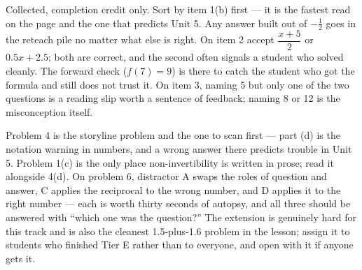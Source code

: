 \documentclass[10pt]{article}
\begin{document}
\begin{teachernote}
Collected, completion credit only. Sort by item 1(b) first --- it is the fastest
read on the page and the one that predicts Unit 5. Any answer built out of
$-\tfrac{1}{2}$ goes in the reteach pile no matter what else is right. On item 2
accept $\dfrac{x+5}{2}$ or $0.5x + 2.5$; both are correct, and the second often
signals a student who solved cleanly. The forward check ($f(7) = 9$) is there to
catch the student who got the formula and still does not trust it. On item 3,
naming 5 but only one of the two questions is a reading slip worth a sentence of
feedback; naming 8 or 12 is the misconception itself.
\end{teachernote}

\begin{teachernote}[Homework]
Problem 4 is the storyline problem and the one to scan first --- part (d) is the
notation warning in numbers, and a wrong answer there predicts trouble in
Unit 5. Problem 1(c) is the only place non-invertibility is written in prose;
read it alongside 4(d). On problem 6, distractor A swaps the roles of question
and answer, C applies the reciprocal to the wrong number, and D applies it to
the right number --- each is worth thirty seconds of autopsy, and all three
should be answered with ``which one was the question?'' The extension is
genuinely hard for this track and is also the cleanest 1.5-plus-1.6 problem in
the lesson; assign it to students who finished Tier E rather than to everyone,
and open with it if anyone gets it.
\end{teachernote}
\end{document}
